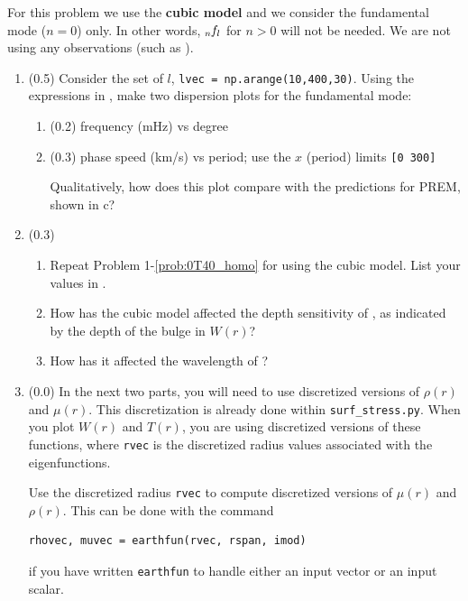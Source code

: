 \documentclass[11pt,titlepage,fleqn]{article}
\newcommand{\tfiless}{{\tt surf\_stress.py}}
\begin{document}
For this problem we use the {\bf cubic model} and we consider the fundamental mode ($n=0$) only. In other words, $\mbox{${}_{n\hspace{-0.2 mm}}f_l$}$ for $n > 0$ will not be needed. We are not using any observations (such as ).

\begin{enumerate}
\item (0.5) Consider the set of $l$, \verb+lvec = np.arange(10,400,30)+. Using the expressions in , make two dispersion plots for the fundamental mode:
%
\begin{enumerate}
\item (0.2) frequency (mHz) vs degree

\item (0.3) phase speed (km/s) vs period; use the $x$ (period) limits \verb+[0 300]+

Qualitatively, how does this plot compare with the predictions for PREM, shown in c?
\end{enumerate}

\item (0.3)
%
\begin{enumerate}
\item Repeat Problem 1-\ref{prob:0T40_homo} for  using the cubic model. List your values in .
\item How has the cubic model affected the depth sensitivity of , as indicated by the depth of the bulge in $W(r)$?
\item How has it affected the wavelength of ?
\end{enumerate}

\label{prob:0T40_cubic}


\item (0.0) In the next two parts, you will need to use discretized versions of $\rho(r)$ and $\mu(r)$. This discretization is already done within \tfiless. When you plot $W(r)$ and $T(r)$, you are using discretized versions of these functions, where \verb+rvec+ is the discretized radius values associated with the eigenfunctions.

Use the discretized radius \verb+rvec+ to compute discretized versions of $\mu(r)$ and $\rho(r)$. This can be done with the command
%
\begin{verbatim}
rhovec, muvec = earthfun(rvec, rspan, imod)
\end{verbatim}
%
if you have written \verb+earthfun+ to handle either an input vector or an input scalar.


\end{enumerate}
\end{document}
